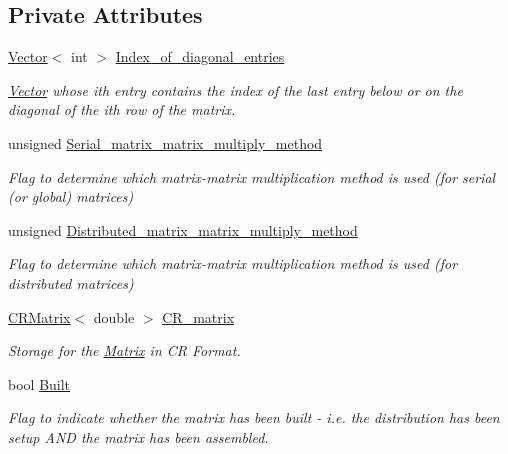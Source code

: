 \subsection*{Private Attributes}
\begin{DoxyCompactItemize}
\item 
\hyperlink{classoomph_1_1Vector}{Vector}$<$ int $>$ \hyperlink{classoomph_1_1CRDoubleMatrix_a6cb9860ebacf742fc7fc47d77703cc82}{Index\+\_\+of\+\_\+diagonal\+\_\+entries}
\begin{DoxyCompactList}\small\item\em \hyperlink{classoomph_1_1Vector}{Vector} whose i\textquotesingle{}th entry contains the index of the last entry below or on the diagonal of the i\textquotesingle{}th row of the matrix. \end{DoxyCompactList}\item 
unsigned \hyperlink{classoomph_1_1CRDoubleMatrix_ac8fab9824a0766b6bb6361a6b25df9ce}{Serial\+\_\+matrix\+\_\+matrix\+\_\+multiply\+\_\+method}
\begin{DoxyCompactList}\small\item\em Flag to determine which matrix-\/matrix multiplication method is used (for serial (or global) matrices) \end{DoxyCompactList}\item 
unsigned \hyperlink{classoomph_1_1CRDoubleMatrix_a4ab4056eff376d383c613a11082651cb}{Distributed\+\_\+matrix\+\_\+matrix\+\_\+multiply\+\_\+method}
\begin{DoxyCompactList}\small\item\em Flag to determine which matrix-\/matrix multiplication method is used (for distributed matrices) \end{DoxyCompactList}\item 
\hyperlink{classoomph_1_1CRMatrix}{C\+R\+Matrix}$<$ double $>$ \hyperlink{classoomph_1_1CRDoubleMatrix_aefc9a269911694cdd5bde98dc536148f}{C\+R\+\_\+matrix}
\begin{DoxyCompactList}\small\item\em Storage for the \hyperlink{classoomph_1_1Matrix}{Matrix} in CR Format. \end{DoxyCompactList}\item 
bool \hyperlink{classoomph_1_1CRDoubleMatrix_a63afd9976f0970a4e6ffee3755d21540}{Built}
\begin{DoxyCompactList}\small\item\em Flag to indicate whether the matrix has been built -\/ i.\+e. the distribution has been setup A\+ND the matrix has been assembled. \end{DoxyCompactList}\end{DoxyCompactItemize}

